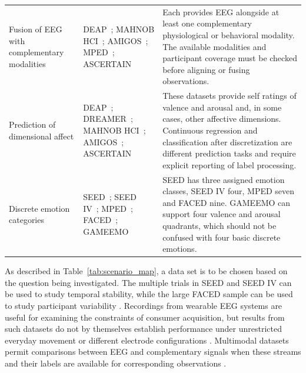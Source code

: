 \documentclass[ASNA,twocolumn]{USG}
\newcommand{\lightrowsep}{%
  \arrayrulecolor{lightrowgray}%
  \specialrule{0.30pt}{3.5pt}{3.5pt}%
  \arrayrulecolor{black}%
}
\begin{document}
\begin{table}[tp]
\begin{tabularx}{\textwidth}{@{}
>{\raggedright\arraybackslash}p{}
>{\raggedright\arraybackslash}p{}
>{\raggedright\arraybackslash}X@{}}
\lightrowsep
Fusion of EEG with complementary modalities & DEAP~\cite{koelstra2011deap}; MAHNOB HCI~\cite{soleymani2011multimodal}; AMIGOS~\cite{miranda2018amigos}; MPED~\cite{song2019mped}; ASCERTAIN~\cite{subramanian2016ascertain} & Each provides EEG alongside at least one complementary physiological or behavioral modality. The available modalities and participant coverage must be checked before aligning or fusing observations. \\
\lightrowsep
Prediction of dimensional affect & DEAP~\cite{koelstra2011deap}; DREAMER~\cite{katsigiannis2017dreamer}; MAHNOB HCI~\cite{soleymani2011multimodal}; AMIGOS~\cite{miranda2018amigos}; ASCERTAIN~\cite{subramanian2016ascertain} & These datasets provide self ratings of valence and arousal and, in some cases, other affective dimensions. Continuous regression and classification after discretization are different prediction tasks and require explicit reporting of label processing. \\
\lightrowsep
Discrete emotion categories & SEED~\cite{seed_page}; SEED IV~\cite{seediv_page}; MPED~\cite{song2019mped}; FACED~\cite{chen2023large}; GAMEEMO~\cite{toraman2021gameemo} & SEED has three assigned emotion classes, SEED IV four, MPED seven and FACED nine. GAMEEMO can support four valence and arousal quadrants, which should not be confused with four basic discrete emotions. \\
\bottomrule
\end{tabularx}
\end{table}

As described in Table~\ref{tab:scenario_map}, a data set is to be chosen based on the question being investigated. The multiple trials in SEED and SEED IV can be used to study temporal stability, while the large FACED sample can be used to study participant variability \cite{zheng2017identifying,chen2023large}. Recordings from wearable EEG systems are useful for examining the constraints of consumer acquisition, but results from such datasets do not by themselves establish performance under unrestricted everyday movement or different electrode configurations \cite{dadebayev2022eeg}. Multimodal datasets permit comparisons between EEG and complementary signals when these streams and their labels are available for corresponding observations \cite{wang2024research}.
\end{document}
